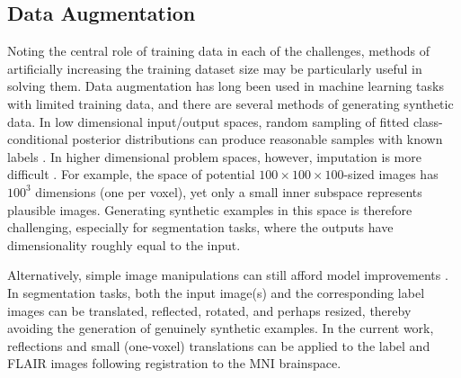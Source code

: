 \subsection{Data Augmentation}
Noting the central role of training data in each of the challenges, methods of artificially increasing the training dataset size may be particularly useful in solving them. Data augmentation has long been used in machine learning tasks with limited training data, and there are several methods of generating synthetic data. In low dimensional input/output spaces, random sampling of fitted class-conditional posterior distributions can produce reasonable samples with known labels \cite{Tanner1987}. In higher dimensional problem spaces, however, imputation is more difficult \cite{Goodfellow2014}. For example, the space of potential $100\times100\times100$-sized images has $100^3$ dimensions (one per voxel), yet only a small inner subspace represents plausible images. Generating synthetic examples in this space is therefore challenging, especially for segmentation tasks, where the outputs have dimensionality roughly equal to the input.
\par
Alternatively, simple image manipulations can still afford model improvements \cite{Krizhevsky2012}. In segmentation tasks, both the input image(s) and the corresponding label images can be translated, reflected, rotated, and perhaps resized, thereby avoiding the generation of genuinely synthetic examples. In the current work, reflections and small (one-voxel) translations can be applied to the label and FLAIR images following registration to the MNI brainspace.
